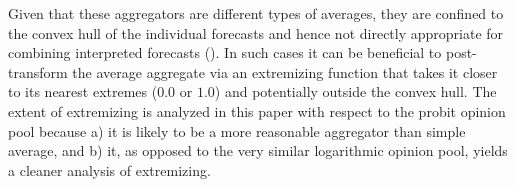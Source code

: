 \documentclass[11pt]{article}
\theoremstyle{definition}
\theoremstyle{definition}
\begin{document}
Given that these aggregators are different types of averages, they are confined to the convex hull of the individual forecasts and hence not directly appropriate for combining interpreted forecasts (\cite{parunak2013characterizing}). In such cases it can be beneficial to post-transform the average aggregate via an extremizing function that takes it closer to its nearest extremes ($0.0$ or $1.0$) and potentially  outside the convex hull. The extent of extremizing is analyzed in this paper with respect to the probit opinion pool because a) it is likely to be a more reasonable aggregator than simple average, and b) it, as opposed to the very similar logarithmic opinion pool, yields a cleaner analysis of extremizing. 



\end{document}
